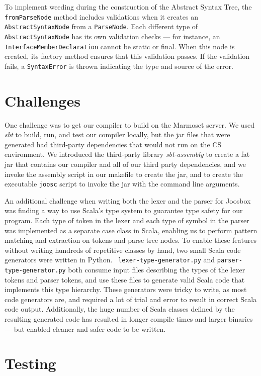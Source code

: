 \documentclass[letterpaper]{article}
\begin{document}
  To implement weeding during the construction of the Abstract Syntax Tree, the
  {\tt fromParseNode} method includes validations when it creates an {\tt
  AbstractSyntaxNode} from a {\tt ParseNode}. Each different type of {\tt
  AbstractSyntaxNode}  has its own validation checks --- for instance, an {\tt
  InterfaceMemberDeclaration} cannot be static  or final. When this node is
  created, its factory method ensures that this validation passes. If the
  validation  fails, a {\tt SyntaxError} is thrown indicating the type and
  source of the error.

  \section{Challenges}

  One challenge was to get our compiler to build on the Marmoset server. We used
  {\em sbt} to build, run, and test our compiler locally, but the jar files that
  were generated had third-party dependencies that would not run on the CS
  environment. We introduced the third-party library {\em sbt-assembly} to
  create a fat jar that contains our compiler and all of our third party
  dependencies, and we invoke the assembly script in our makefile to create the
  jar, and to create the executable {\tt joosc} script to invoke the jar with the
  command line arguments.

  An additional challenge when writing both the lexer and the parser for Joosbox
  was finding a way to use Scala's type system to guarantee type safety for our
  program. Each type of token in the lexer and each type of symbol in the parser
  was implemented as a separate case class in Scala, enabling us to perform
  pattern matching and extraction on tokens and parse tree nodes. To enable
  these features without writing hundreds of repetitive classes by hand, two
  small Scala code generators were written in Python.  {\tt
  lexer-type-generator.py} and {\tt parser-type-generator.py} both consume input
  files describing the types of the lexer tokens and parser tokens, and use
  these files to generate valid Scala code that implements this type hierarchy.
  These generators were tricky to write, as most code generators are, and
  required a lot of trial and error to result in correct Scala code output.
  Additionally, the huge number of Scala classes defined by the resulting
  generated code has resulted in longer compile times and larger binaries ---
  but enabled cleaner and safer code to be written.

  \section{Testing}
\end{document}
